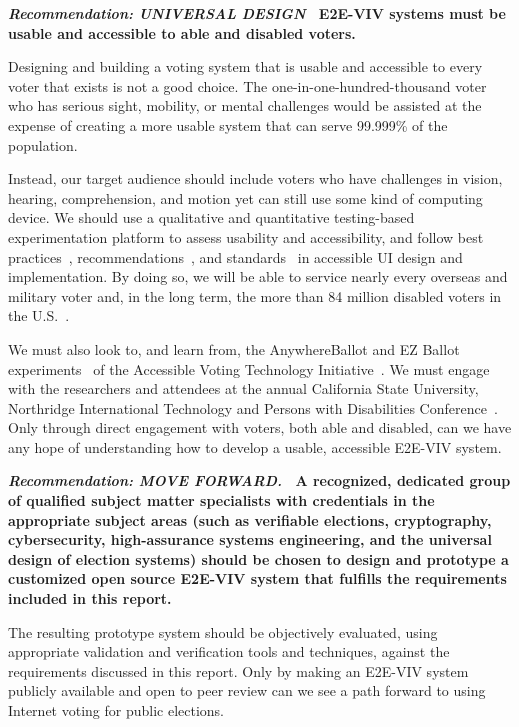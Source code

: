 \vspace{12pt} \textbf{\emph{Recommendation: UNIVERSAL DESIGN} \
  E2E-VIV systems must be usable and accessible to able and disabled
  voters.}

Designing and building a voting system that is usable and accessible
to every voter that exists is not a good choice. The
one-in-one-hundred-thousand voter who has serious sight, mobility, or
mental challenges would be assisted at the expense of creating a more
usable system that can serve 99.999\% of the population.

Instead, our target audience should include voters who have challenges
in vision, hearing, comprehension, and motion yet can still use some
kind of computing device. We should use a qualitative and quantitative
testing-based experimentation platform to assess usability and
accessibility, and follow best
practices~\cite{materials-at-elections.itif.org},
recommendations~\cite{WAI,Section508,WAVE}, and
standards~\cite{standards} in accessible UI design and
implementation. By doing so, we will be able to service nearly every
overseas and military voter and, in the long term, the more than 84
million disabled voters in the U.S.~\cite{Brennen,CensusData}.

We must also look to, and learn from, the AnywhereBallot and EZ Ballot
experiments~\cite{AnywhereBallot,lee2012ez} of the Accessible Voting
Technology Initiative~\cite{AVTI}.  We must engage with the
researchers and attendees at the annual California State University,
Northridge International Technology and Persons with Disabilities
Conference~\cite{CSUN}. Only through direct engagement with voters,
both able and disabled, can we have any hope of understanding how to
develop a usable, accessible E2E-VIV system.

\vspace{12pt} 

\textbf{\emph{Recommendation: MOVE FORWARD.} \ A recognized, dedicated
  group of qualified subject matter specialists with credentials in
  the appropriate subject areas (such as verifiable elections,
  cryptography, cybersecurity, high-assurance systems engineering, and
  the universal design of election systems) should be chosen to design
  and prototype a customized open source E2E-VIV system that fulfills
  the requirements included in this report.}

The resulting prototype system should be objectively evaluated, using
appropriate validation and verification tools and techniques, against
the requirements discussed in this report. Only by making an E2E-VIV
system publicly available and open to peer review can we see a path
forward to using Internet voting for public elections.

